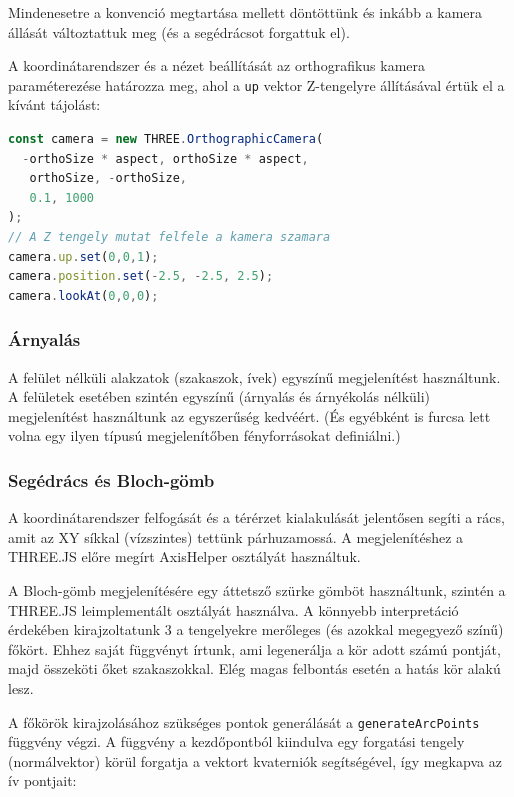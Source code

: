 \documentclass[12pt]{article}
\begin{document}
	Mindenesetre a konvenció megtartása mellett döntöttünk és inkább a kamera állását változtattuk meg (és a segédrácsot forgattuk el).
	
	A koordinátarendszer és a nézet beállítását az orthografikus kamera paraméterezése határozza meg, ahol a \texttt{up} vektor Z-tengelyre állításával értük el a kívánt tájolást:

\begin{lstlisting}[language=JavaScript]
const camera = new THREE.OrthographicCamera(
  -orthoSize * aspect, orthoSize * aspect,
   orthoSize, -orthoSize,
   0.1, 1000
);
// A Z tengely mutat felfele a kamera szamara
camera.up.set(0,0,1); 
camera.position.set(-2.5, -2.5, 2.5); 
camera.lookAt(0,0,0);
\end{lstlisting}
	
	
	\subsubsection{Árnyalás}
	A felület nélküli alakzatok (szakaszok, ívek) egyszínű megjelenítést használtunk. A felületek esetében szintén egyszínű (árnyalás és árnyékolás nélküli) megjelenítést használtunk az egyszerűség kedvéért. (És egyébként is furcsa lett volna egy ilyen típusú megjelenítőben fényforrásokat definiálni.)
	
	\subsubsection{Segédrács és Bloch-gömb}
	A koordinátarendszer felfogását és a térérzet kialakulását jelentősen segíti a rács, amit az XY síkkal (vízszintes) tettünk párhuzamossá. A megjelenítéshez a THREE.JS előre megírt AxisHelper osztályát használtuk.
	
	
	A Bloch-gömb megjelenítésére egy áttetsző szürke gömböt használtunk, szintén a THREE.JS leimplementált osztályát használva. A könnyebb interpretáció érdekében kirajzoltatunk 3 a tengelyekre merőleges (és azokkal megegyező színű) főkört. Ehhez saját függvényt írtunk, ami legenerálja a kör adott számú pontját, majd összeköti őket szakaszokkal. Elég magas felbontás esetén a hatás kör alakú lesz.
	
	A főkörök kirajzolásához szükséges pontok generálását a \texttt{generateArcPoints} függvény végzi. A függvény a kezdőpontból kiindulva egy forgatási tengely (normálvektor) körül forgatja a vektort kvaterniók segítségével, így megkapva az ív pontjait:
\end{document}
